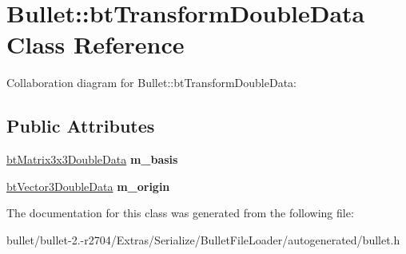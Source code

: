 \hypertarget{class_bullet_1_1bt_transform_double_data}{\section{Bullet\+:\+:bt\+Transform\+Double\+Data Class Reference}
\label{class_bullet_1_1bt_transform_double_data}
}


Collaboration diagram for Bullet\+:\+:bt\+Transform\+Double\+Data\+:
\subsection*{Public Attributes}
\begin{DoxyCompactItemize}
\item 
\hypertarget{class_bullet_1_1bt_transform_double_data_a745c15aa538b7b0418ef2df9c530c5c8}{\hyperlink{class_bullet_1_1bt_matrix3x3_double_data}{bt\+Matrix3x3\+Double\+Data} {\bfseries m\+\_\+basis}}\label{class_bullet_1_1bt_transform_double_data_a745c15aa538b7b0418ef2df9c530c5c8}

\item 
\hypertarget{class_bullet_1_1bt_transform_double_data_a436315282e06f6155c8f1b97a6df40a6}{\hyperlink{class_bullet_1_1bt_vector3_double_data}{bt\+Vector3\+Double\+Data} {\bfseries m\+\_\+origin}}\label{class_bullet_1_1bt_transform_double_data_a436315282e06f6155c8f1b97a6df40a6}

\end{DoxyCompactItemize}


The documentation for this class was generated from the following file\+:\begin{DoxyCompactItemize}
\item 
bullet/bullet-\/2.-\/r2704/\+Extras/\+Serialize/\+Bullet\+File\+Loader/autogenerated/bullet.\+h\end{DoxyCompactItemize}
